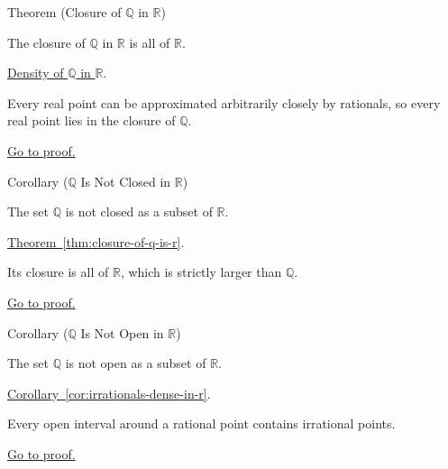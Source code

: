 \begin{theorembox}{Theorem (Closure of $\mathbb{Q}$ in $\mathbb{R}$)}
\begin{theorem}
\label{thm:closure-of-q-is-r}
The closure of $\mathbb{Q}$ in $\mathbb{R}$ is all of $\mathbb{R}$.
\end{theorem}
\end{theorembox}
\begin{dependencies}
\hyperref[thm:q-dense-in-r]{Density of $\mathbb{Q}$ in $\mathbb{R}$}.
\end{dependencies}
\begin{remark*}
Every real point can be approximated arbitrarily closely by rationals, so every
real point lies in the closure of $\mathbb{Q}$.
\end{remark*}
\begin{remark*}[Proof]
\hyperref[prf:closure-of-q-is-r]{Go to proof.}
\end{remark*}

\begin{corollarybox}{Corollary ($\mathbb{Q}$ Is Not Closed in $\mathbb{R}$)}
\begin{corollary}
\label{cor:q-not-closed-in-r}
The set $\mathbb{Q}$ is not closed as a subset of $\mathbb{R}$.
\end{corollary}
\end{corollarybox}
\begin{dependencies}
\hyperref[thm:closure-of-q-is-r]{Theorem~\ref*{thm:closure-of-q-is-r}}.
\end{dependencies}
\begin{remark*}
Its closure is all of $\mathbb{R}$, which is strictly larger than $\mathbb{Q}$.
\end{remark*}
\begin{remark*}[Proof]
\hyperref[prf:q-not-closed-in-r]{Go to proof.}
\end{remark*}

\begin{corollarybox}{Corollary ($\mathbb{Q}$ Is Not Open in $\mathbb{R}$)}
\begin{corollary}
\label{cor:q-not-open-in-r}
The set $\mathbb{Q}$ is not open as a subset of $\mathbb{R}$.
\end{corollary}
\end{corollarybox}
\begin{dependencies}
\hyperref[cor:irrationals-dense-in-r]{Corollary~\ref*{cor:irrationals-dense-in-r}}.
\end{dependencies}
\begin{remark*}
Every open interval around a rational point contains irrational points.
\end{remark*}
\begin{remark*}[Proof]
\hyperref[prf:q-not-open-in-r]{Go to proof.}
\end{remark*}

